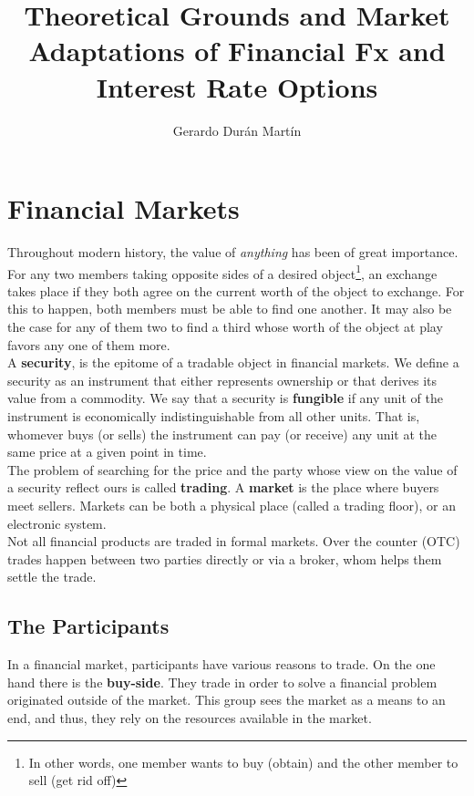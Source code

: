 \documentclass[11pt]{report}
\title{Theoretical Grounds and Market Adaptations of Financial Fx and Interest Rate Options}
\author{Gerardo Dur\'an Mart\'in}
\begin{document}
\tableofcontents

\chapter{Financial Markets}

Throughout modern history, the value of \textit{anything} has been of great importance. For any two members taking opposite sides of a desired object\footnote{In other words, one member wants to buy (obtain) and the other member to sell (get rid off)}, an exchange takes place if they both agree on the current worth of the object to exchange. For this to happen, both members must be able to find one another. It may also be the case for any of them two to find a third whose worth of the object at play favors any one of them more.\\

A \textbf{security}, is the epitome of a tradable object in financial markets. We define a security as an instrument that either represents ownership or that derives its value from a commodity. We say that a security is \textbf{fungible} if any unit of the instrument is economically indistinguishable from all other units. That is, whomever buys (or sells) the instrument can pay (or receive) any unit at the same price at a given point in time.\\

The problem of searching for the price and the party whose view on the value of a security reflect ours is called \textbf{trading}. A \textbf{market} is the place where buyers meet sellers. Markets can be both a physical place (called a trading floor), or an electronic system.\\

Not all financial products are traded in formal markets. Over the counter (OTC) trades happen between two parties directly or via a broker, whom helps them settle the trade. 

\section{The Participants}
In a financial market, participants have various reasons to trade. On the one hand there is the \textbf{buy-side}. They trade in order to solve a financial problem originated outside of the market. This group sees the market as a means to an end, and thus, they rely on the resources available in the market.\\
\end{document}
